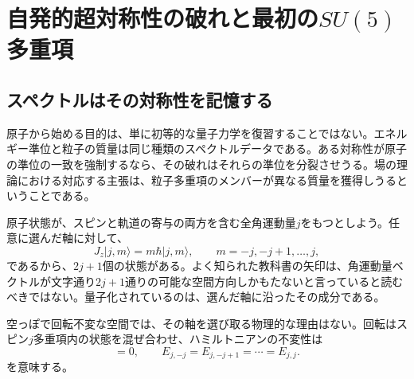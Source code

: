 \chapter{自発的超対称性の破れと最初の\texorpdfstring{\(SU(5)\)}{SU(5)}多重項}


\section{スペクトルはその対称性を記憶する}

原子から始める目的は、単に初等的な量子力学を復習することではない。エネルギー準位と粒子の質量は同じ種類のスペクトルデータである。ある対称性が原子の準位の一致を強制するなら、その破れはそれらの準位を分裂させうる。場の理論における対応する主張は、粒子多重項のメンバーが異なる質量を獲得しうるということである。

原子状態が、スピンと軌道の寄与の両方を含む全角運動量\(j\)をもつとしよう。任意に選んだ軸に対して、
\begin{equation}
J_z|j,m\rangle=m\hbar|j,m\rangle,
\qquad
m=-j,-j+1,\ldots,j,
\end{equation}
であるから、\(2j+1\)個の状態がある。よく知られた教科書の矢印は、角運動量ベクトルが文字通り\(2j+1\)通りの可能な空間方向しかもたないと言っていると読むべきではない。量子化されているのは、選んだ軸に沿ったその成分である。

空っぽで回転不変な空間では、その軸を選び取る物理的な理由はない。回転はスピン\(j\)多重項内の状態を混ぜ合わせ、ハミルトニアンの不変性は
\begin{equation}
[H,\mathbf J]=0,
\qquad
E_{j,-j}=E_{j,-j+1}=\cdots=E_{j,j}.
\label{eq:l9-degeneracy}
\end{equation}
を意味する。

